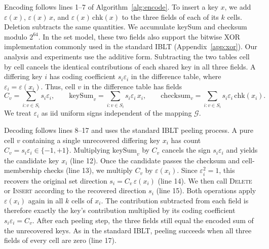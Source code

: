 Encoding follows lines 1--7 of Algorithm~\ref{alg:encode}. To insert a key $x$, we add $\varepsilon(x)$, $\varepsilon(x)\,x$, and $\varepsilon(x)\,\mathrm{chk}(x)$ to the three fields of each of its $k$ cells. Deletion subtracts the same quantities. We accumulate keySum and checksum modulo $2^{64}$. In the set model, these two fields also support the bitwise XOR implementation commonly used in the standard IBLT (Appendix~\ref{app:xor}). Our analysis and experiments use the additive form. Subtracting the two tables cell by cell cancels the identical contributions of each shared key in all three fields. A differing key $i$ has coding coefficient $s_i\varepsilon_i$ in the difference table, where $\varepsilon_i=\varepsilon(x_i)$. Thus, cell $v$ in the difference table has fields
\begin{equation}
C_v=\sum_{i:v\in S_i}s_i\varepsilon_i,\qquad
\mathrm{keySum}_v=\sum_{i:v\in S_i}s_i\varepsilon_i\,x_i,\qquad
\mathrm{checksum}_v=\sum_{i:v\in S_i}s_i\varepsilon_i\,\mathrm{chk}(x_i).\label{eq:fields}
\end{equation}
We treat $\varepsilon_i$ as iid uniform signs independent of the mapping $\mathcal G$.

Decoding follows lines 8--17 and uses the standard IBLT peeling process. A pure cell $v$ containing a single unrecovered differing key $x_i$ has count $C_v=s_i\varepsilon_i\in\{-1,+1\}$. Multiplying $\mathrm{keySum}_v$ by $C_v$ cancels the sign $s_i\varepsilon_i$ and yields the candidate key $x_i$ (line 12). Once the candidate passes the checksum and cell-membership checks (line 13), we multiply $C_v$ by $\varepsilon(x_i)$. Since $\varepsilon_i^2=1$, this recovers the original set direction $s_i=C_v\,\varepsilon(x_i)$ (line 14). We then call \textsc{Delete} or \textsc{Insert} according to the recovered direction $s_i$ (line 15). Both operations apply $\varepsilon(x_i)$ again in all $k$ cells of $x_i$. The contribution subtracted from each field is therefore exactly the key's contribution multiplied by its coding coefficient $s_i\varepsilon_i=C_v$. After each peeling step, the three fields still equal the encoded sum of the unrecovered keys. As in the standard IBLT, peeling succeeds when all three fields of every cell are zero (line 17).

